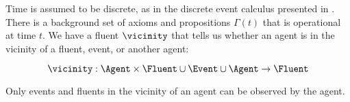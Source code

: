 Time is assumed to be discrete, as in the
discrete event calculus presented in \cite{mueller_commonsense_2014}.  There is a
background set of axioms and propositions $\Gamma(t)$ that is
operational at time $t$.  We have a fluent $\vicinity$ that tells us
whether an agent is in the vicinity of a fluent, event, or another
agent:

$$\vicinity: \Agent \times \Fluent \cup \Event \cup \Agent \rightarrow
\Fluent $$

Only events and fluents in the vicinity of an agent can be
observed by the agent.

\begin{comment}
For the cognitive condition $\mathcal{C}$ above, we have the following
concrete requirements that we implement in our system.  Later, we give
examples of these requirements in action.

  \begin{footnotesize}
    \begin{mdframed}[frametitle= Formal Requirements for $\mathcal{C}$ ,
      frametitlebackgroundcolor=gray!25, nobreak,
      linecolor=white,backgroundcolor=gray!10]
      Assume $\Gamma \vdash t < t + \Delta$
      \begin{enumerate}
      \item[$\mathbf{C}^f_1:$] It is common knowledge that, if an
        agent $x$ has a false belief, $\gamma$ informs the agent of
        the belief:\footnote{Please note that inference in \CEC\ is
          non-monotonic as it includes the event calculus, which is
          non-monotonic.  If an agent $a$ believes $\phi$ based on
          prior information, adding new information can cause the
          agent to not believe $\phi$.}
         \begin{equation*}
          \common\color{gray!80}\left(\color{black}t, \left[\begin{aligned}
                &  \believes(\gamma, t, \phi) \land \believes(\gamma, t,
                \believes\big(x, t, \lnot \phi)\big)
                \\ & \hspace{50pt} \rightarrow \\
                & \hspace{30pt}\says(\gamma, x, t + \Delta, \phi)
              \end{aligned}\right]\color{gray!80}\right)\color{black}
        \end{equation*}


\end{comment}
